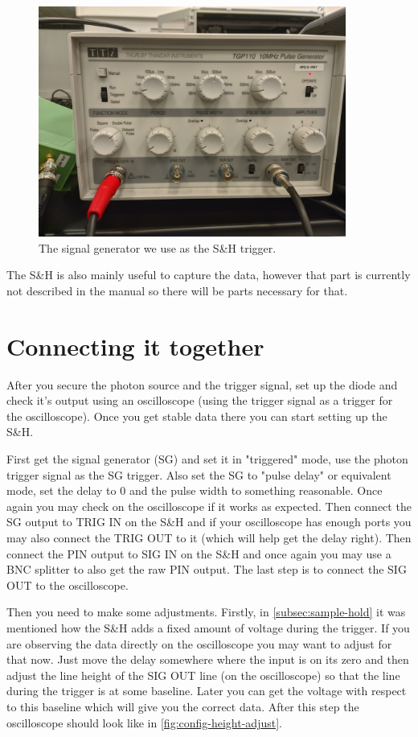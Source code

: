 \documentclass[a4paper, 10pt]{article}
\begin{document}
\begin{figure}[H]
    \centering
    \includegraphics[width=0.9\textwidth]{../images/signal-generator.jpg}
    \caption{The signal generator we use as the S\&H trigger.}
    \label{fig:signal-generator}
\end{figure}

The S\&H is also mainly useful to capture the data, however that part is currently not described in the manual so there will be parts necessary for that.

\section{Connecting it together}
After you secure the photon source and the trigger signal, set up the diode and check it's output using an oscilloscope (using the trigger signal as a trigger for the oscilloscope).
Once you get stable data there you can start setting up the S\&H.

First get the signal generator (SG) and set it in "triggered" mode, use the photon trigger signal as the SG trigger.
Also set the SG to "pulse delay" or equivalent mode, set the delay to 0 and the pulse width to something reasonable.
Once again you may check on the oscilloscope if it works as expected.
Then connect the SG output to TRIG IN on the S\&H and if your oscilloscope has enough ports you may also connect the TRIG OUT to it (which will help get the delay right).
Then connect the PIN output to SIG IN on the S\&H and once again you may use a BNC splitter to also get the raw PIN output.
The last step is to connect the SIG OUT to the oscilloscope.

Then you need to make some adjustments.
Firstly, in \cref{subsec:sample-hold} it was mentioned how the S\&H adds a fixed amount of voltage during the trigger.
If you are observing the data directly on the oscilloscope you may want to adjust for that now.
Just move the delay somewhere where the input is on its zero and then adjust the line height of the SIG OUT line (on the oscilloscope) so that the line during the trigger is at some baseline.
Later you can get the voltage with respect to this baseline which will give you the correct data.
After this step the oscilloscope should look like in \cref{fig:config-height-adjust}.
\end{document}
